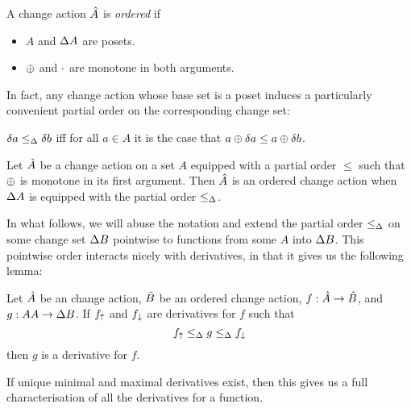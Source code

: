\begin{defn}
  A change action $\hat{A}$ is \emph{ordered} if
  \begin{itemize}
    \item $A$ and $\Delta A$ are posets.
    \item $\oplus$ and $\cdot$ are monotone in both arguments.
  \end{itemize}
\end{defn}

In fact, any change action whose base set is a poset induces a particularly convenient partial order
on the corresponding change set:

\begin{defn}
  $\delta a \leq_\Delta \delta b$ iff for all $a \in A$ it is the case that $a \oplus \delta a \leq a \oplus \delta b$.
\end{defn}

\begin{prop}
  Let $\hat{A}$ be a change action on a set $A$ equipped with a partial order $\leq$ such that
  $\oplus$ is monotone in its first argument. Then $\hat{A}$ is an ordered change action when
  $\Delta A$ is equipped with the partial order $\leq_\Delta$.
\end{prop}

In what follows, we will abuse the notation and extend the partial order $\leq_\Delta$ on some change
set $\Delta B$ pointwise to functions from some $A$ into $\Delta B$. This pointwise
order interacts nicely with derivatives, in that it gives us the following lemma:

\begin{thm}
  \label{thm:sandwich}
  Let $\hat{A}$ be an change action, $\hat{B}$ be an ordered change action,
  $f: \hat{A} \rightarrow \hat{B}$, and $g: A \time \changes{A} \rightarrow
  \changes{B}$. If $f_\uparrow$ and $f_\downarrow$ are
  derivatives for $f$ such that
  \begin{displaymath}
    f_\uparrow \leq_\Delta g \leq_\Delta f_\downarrow
  \end{displaymath}
  then $g$ is a derivative for $f$.
\end{thm}

If unique minimal and maximal derivatives exist, then this gives us a full
characterisation of all the derivatives for a function.

